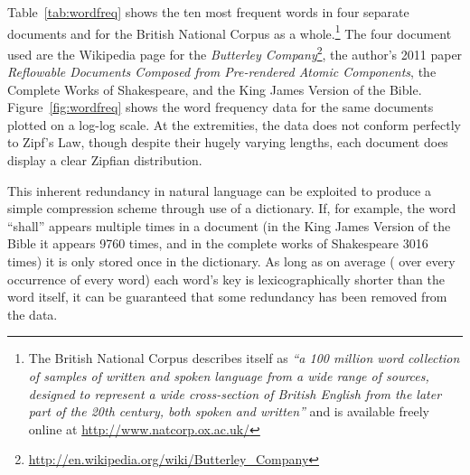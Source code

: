 Table~\ref{tab:wordfreq} shows the ten most frequent words in four separate documents and for the British National Corpus\hspace{0pt}\cite{BNCConsortium2007} as a whole.\footnote{The British National Corpus describes itself as \emph{``a 100 million word collection of samples of written and spoken language from a wide range of sources, designed to represent a wide cross-section of British English from the later part of the 20th century, both spoken and written''} and is available freely online at \url{http://www.natcorp.ox.ac.uk/}} The four document used are the Wikipedia page for the \emph{Butterley Company}\footnote{\url{http://en.wikipedia.org/wiki/Butterley\_Company}}, the author's 2011 paper \emph{Reflowable Documents Composed from Pre-rendered Atomic Components}\hspace{0pt}\cite{Pinkney2011}, the Complete Works of Shakespeare, and the King James Version of the Bible. Figure~\ref{fig:wordfreq} shows the word frequency data for the same documents plotted on a log-log scale. At the extremities, the data does not conform perfectly to Zipf's Law, though despite their hugely varying lengths, each document does display a clear Zipfian distribution.


This inherent redundancy in natural language can be exploited to produce a simple compression scheme through use of a dictionary. If, for example, the word ``shall'' appears multiple times in a document (in the King James Version of the Bible it appears 9760 times, and in the complete works of Shakespeare 3016 times) it is only stored once in the dictionary. As long as on average (\ie{} over every occurrence of every word) each word's key is lexicographically shorter than the word itself, it can be guaranteed that some redundancy has been removed from the data.

